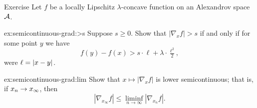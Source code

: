 \begin{thm}{Exercise}\label{ex:semicontinuous-grad}
Let $f$ be a locally Lipschitz $\lambda$-concave function on an Alexandrov space $\mathcal{A}$.

\begin{subthm}{ex:semicontinuous-grad:>s}
Suppose $s\ge 0$.
Show that $|\nabla_xf|> s$ if and only if for some point $y$ we have
\[f(y)-f(x)>s\cdot \ell+\lambda\cdot \tfrac{\ell^2}2,\]
were $\ell=|{x}-{y}|_{}^{{}}$.
\end{subthm}

\begin{subthm}{ex:semicontinuous-grad:lim} Show that $x\mapsto|\nabla_xf|$ is lower semicontinuous;
that is, if $x_n\to x_\infty$, then
\[|\nabla_{x_\infty}f|\le \liminf_{n\to\infty} |\nabla_{x_n}f|.\]
\end{subthm}

\end{thm}
